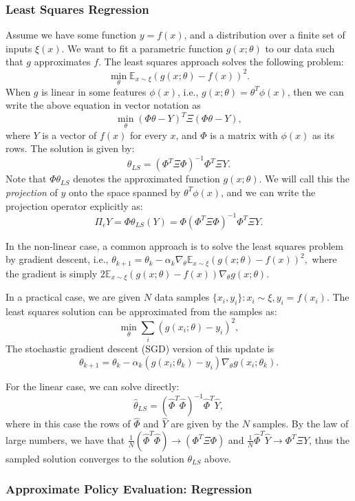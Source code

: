 \subsubsection{Least Squares Regression}
Assume we have some function $y = f(x)$, and a distribution over a finite set of inputs $\xi(x)$. 
We want to fit a parametric function $g(x;\theta)$ to our data such that $g$ approximates $f$. The least squares approach solves the following problem:
$$
\min_\theta \mathbb{E}_{x\sim\xi} (g(x;\theta) - f(x))^2.
$$
When $g$ is linear in some features $\phi(x)$, i.e., $g(x;\theta) = \theta^T \phi(x)$, then we can write the above equation in vector notation as
$$
\min_\theta (\Phi \theta - Y)^T \Xi (\Phi \theta - Y),
$$
where $Y$ is a vector of $f(x)$ for every $x$, and $\Phi$ is a matrix with $\phi(x)$ as its rows. The solution is given by:
$$
\theta_{LS} = (\Phi^T \Xi \Phi)^{-1} \Phi^T \Xi Y.
$$
Note that $\Phi \theta_{LS}$ denotes the approximated function $g(x;\theta)$. We will call this the \emph{projection} of $y$ onto the space spanned by $\theta^T \phi(x)$, and we can write the projection operator explicitly as:
$$
\Pi_\epsilon Y = \Phi \theta_{LS}(Y) = \Phi (\Phi^T \Xi \Phi)^{-1} \Phi^T \Xi Y.
$$

In the non-linear case, a common approach is to solve the least squares problem by gradient descent, i.e., $\theta_{k+1} = \theta_k - \alpha_k \nabla_\theta \mathbb{E}_{x\sim\xi} (g(x;\theta) - f(x))^2,$ where the gradient is simply $2 \mathbb{E}_{x\sim\xi} (g(x;\theta) - f(x))\nabla_\theta g(x;\theta)$. 

In a practical case, we are given $N$ data samples $\{ x_i, y_i \}: x_i\sim \xi, y_i=f(x_i)$. The least squares solution can be approximated from the samples as:
$$
\min_\theta \sum_i (g(x_i;\theta) - y_i)^2,
$$
The stochastic gradient descent (SGD) version of this update is
$$
\theta_{k+1} = \theta_k - \alpha_k (g(x_i;\theta_k) - y_i)\nabla_\theta g(x_i;\theta_k).
$$

For the linear case, we can solve directly:
$$
\hat{\theta}_{LS} = (\hat{\Phi}^T \hat{\Phi})^{-1} \hat{\Phi}^T \hat{Y},
$$
where in this case the rows of $\hat{\Phi}$ and $\hat{Y}$ are given by the $N$ samples. By the law of large numbers, we have that $\frac{1}{N}(\hat{\Phi}^T \hat{\Phi}) \to (\Phi^T \Xi \Phi)$ and $\frac{1}{N}\hat{\Phi}^T \hat{Y} \to \Phi^T \Xi Y$, thus the sampled solution converges to the solution $\theta_{LS}$ above.

\subsubsection{Approximate Policy Evaluation: Regression}

